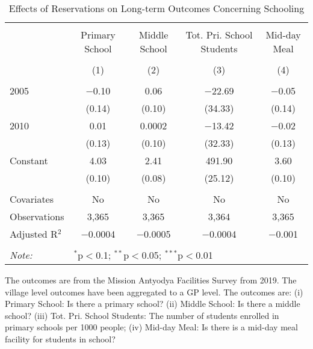 \begin{table}[!htbp]
\centering
\begin{threeparttable}

  \caption{Effects of Reservations on Long-term Outcomes Concerning Schooling} 
  \label{raj_shrug_schooling_05_10} 
\scriptsize 
\begin{tabular}{@{\extracolsep{0pt}}lcccc} 
\\[-1.8ex]\hline 
\hline \\[-1.8ex] 
 & Primary School & Middle School & Tot. Pri. School Students & Mid-day Meal \\ 
\\[-1.8ex] & (1) & (2) & (3) & (4)\\ 
\hline \\[-1.8ex] 
 2005 & $-$0.10 & 0.06 & $-$22.69 & $-$0.05 \\ 
  & (0.14) & (0.10) & (34.33) & (0.14) \\ 
  2010 & 0.01 & 0.0002 & $-$13.42 & $-$0.02 \\ 
  & (0.13) & (0.10) & (32.33) & (0.13) \\ 
  Constant & 4.03 & 2.41 & 491.90 & 3.60 \\ 
  & (0.10) & (0.08) & (25.12) & (0.10) \\ 
 \hline \\[-1.8ex] 
Covariates & No & No & No & No \\ 
Observations & 3,365 & 3,365 & 3,364 & 3,365 \\ 
Adjusted R$^{2}$ & $-$0.0004 & $-$0.0005 & $-$0.0004 & $-$0.001 \\ 
\hline 
\hline \\[-1.8ex] 
\textit{Note:}  & \multicolumn{4}{l}{$^{*}$p$<$0.1; $^{**}$p$<$0.05; $^{***}$p$<$0.01} \\ 
\end{tabular} 
\begin{tablenotes}[flushleft]
\scriptsize
\item The outcomes are from the Mission Antyodya Facilities Survey from 2019. 
                     The village level outcomes have been aggregated to a GP level. 
                     The outcomes are:
                         (i) Primary School: Is there a primary school?
                         (ii) Middle School: Is there a middle school?
                         (iii) Tot. Pri. School Students: The number of students enrolled in primary schools per 1000 people;
                         (iv) Mid-day Meal: Is there is a mid-day meal facility for students in school?
\end{tablenotes}
\end{threeparttable}
\end{table}
